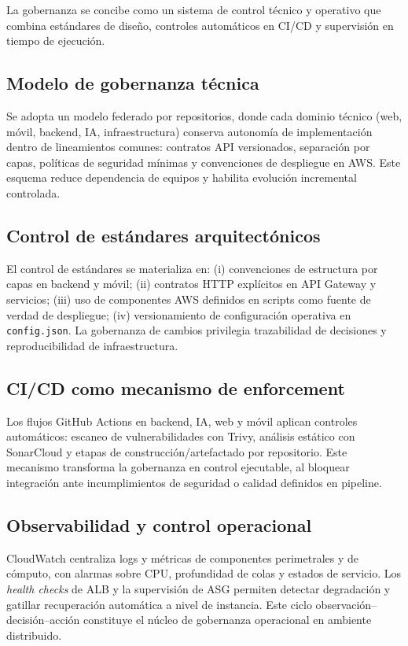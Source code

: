 \documentclass[12pt, letterpaper]{article}
\begin{document}
La gobernanza se concibe como un sistema de control técnico y operativo que combina estándares de diseño, controles automáticos en CI/CD y supervisión en tiempo de ejecución.

\subsection{Modelo de gobernanza técnica}

Se adopta un modelo federado por repositorios, donde cada dominio técnico (web, móvil, backend, IA, infraestructura) conserva autonomía de implementación dentro de lineamientos comunes: contratos API versionados, separación por capas, políticas de seguridad mínimas y convenciones de despliegue en AWS. Este esquema reduce dependencia de equipos y habilita evolución incremental controlada.

\subsection{Control de estándares arquitectónicos}

El control de estándares se materializa en: (i) convenciones de estructura por capas en backend y móvil; (ii) contratos HTTP explícitos en API Gateway y servicios; (iii) uso de componentes AWS definidos en scripts como fuente de verdad de despliegue; (iv) versionamiento de configuración operativa en \texttt{config.json}. La gobernanza de cambios privilegia trazabilidad de decisiones y reproducibilidad de infraestructura.

\subsection{CI/CD como mecanismo de enforcement}

Los flujos GitHub Actions en backend, IA, web y móvil aplican controles automáticos: escaneo de vulnerabilidades con Trivy, análisis estático con SonarCloud y etapas de construcción/artefactado por repositorio. Este mecanismo transforma la gobernanza en control ejecutable, al bloquear integración ante incumplimientos de seguridad o calidad definidos en pipeline.

\subsection{Observabilidad y control operacional}

CloudWatch centraliza logs y métricas de componentes perimetrales y de cómputo, con alarmas sobre CPU, profundidad de colas y estados de servicio. Los \textit{health checks} de ALB y la supervisión de ASG permiten detectar degradación y gatillar recuperación automática a nivel de instancia. Este ciclo observación--decisión--acción constituye el núcleo de gobernanza operacional en ambiente distribuido.
\end{document}
